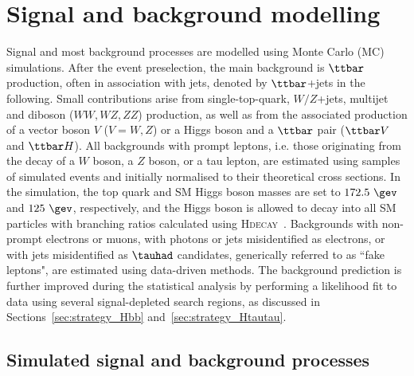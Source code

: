 \section{Signal and background modelling}
\label{sec:signal_background_model}

Signal and most background processes are modelled using Monte Carlo (MC) simulations.
After the event preselection, the main background is $\ttbar$ production, often in association with jets, denoted by $\ttbar$+jets in the following.
Small contributions arise from single-top-quark, $W/Z$+jets, multijet and diboson ($WW,WZ,ZZ$) production, as well as from the associated 
production of a vector boson $V$ ($V=W,Z$) or a Higgs boson and a $\ttbar$ pair ($\ttbar V$ and $\ttbar H$). All backgrounds 
with prompt leptons, i.e. those originating from the decay of a $W$ boson, a $Z$ boson, or a tau lepton,
are estimated using samples of simulated events and initially normalised to their theoretical cross sections.
In the simulation, the top quark and SM Higgs boson masses are set to $172.5~\gev$ and $125~\gev$, respectively,
and the Higgs boson is allowed to decay into all SM particles with branching ratios calculated using \textsc{Hdecay}~\cite{Djouadi:1997yw}.  
Backgrounds with non-prompt electrons or muons, with photons or jets misidentified as electrons, or with jets misidentified as $\tauhad$ candidates, 
generically referred to as ``fake leptons", are estimated using data-driven methods. 
The background prediction is further improved during the statistical analysis by performing a likelihood 
fit to data using several signal-depleted search regions, as discussed in Sections~\ref{sec:strategy_Hbb} and~\ref{sec:strategy_Htautau}.

\subsection{Simulated signal and background processes}
\label{sec:simulations}

